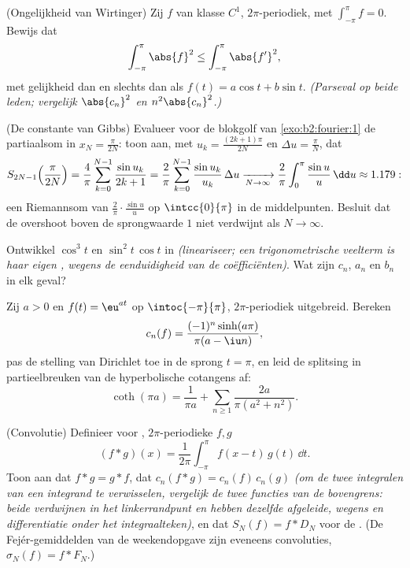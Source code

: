 \begin{exercise}[$\star\star\star$]\label{exo:b2:fourier:7}
(Ongelijkheid van Wirtinger) Zij $f$ van klasse $C^1$,
$2\pi$-periodiek, met $\int_{-\pi}^{\pi} f = 0$. Bewijs dat
\[
\int_{-\pi}^{\pi} \abs{f}^2 \leq \int_{-\pi}^{\pi} \abs{f'}^2 ,
\]
met gelijkheid dan en slechts dan als $f(t) = a\cos t + b\sin t$.
\emph{(Parseval op beide leden; vergelijk $\abs{c_n}^2$ en
$n^2\abs{c_n}^2$.)}
\end{exercise}

\begin{exercise}[$\star\star\star$]\label{exo:b2:fourier:8}
(De constante van Gibbs) Evalueer voor de blokgolf van
\cref{exo:b2:fourier:1} de partiaalsom in $x_N = \frac{\pi}{2N}$:
toon aan, met $u_k = \frac{(2k+1)\pi}{2N}$ en $\Delta u =
\frac{\pi}{N}$, dat
\[
S_{2N-1}\Bigl(\frac{\pi}{2N}\Bigr)
= \frac{4}{\pi}\sum_{k=0}^{N-1} \frac{\sin u_k}{2k+1}
= \frac{2}{\pi}\sum_{k=0}^{N-1} \frac{\sin u_k}{u_k}\,\Delta u
\xrightarrow[N\to\infty]{}
\frac{2}{\pi}\int_0^{\pi}\frac{\sin u}{u}\,\dd u \approx 1.179 :
\]
een Riemannsom van $\frac{2}{\pi}\cdot\frac{\sin u}{u}$ op
$\intcc{0}{\pi}$ in de middelpunten. Besluit dat de overshoot
boven de sprongwaarde $1$ niet verdwijnt als $N \to \infty$.
\end{exercise}

\begin{exercise}[$\star$]\label{exo:b2:fourier:9}
Ontwikkel $\cos^3 t$ en $\sin^2 t\,\cos t$ in 
\emph{(lineariseer; een trigonometrische veelterm is haar eigen
, wegens de eenduidigheid van de coëfficiënten)}. Wat
zijn $c_n$, $a_n$ en $b_n$ in elk geval?
\end{exercise}

\begin{exercise}[$\star\star$]\label{exo:b2:fourier:10}
Zij $a > 0$ en $f(t) = \eu^{at}$ op $\intoc{-\pi}{\pi}$,
$2\pi$-periodiek uitgebreid. Bereken
\[
c_n(f) = \frac{(-1)^n\sinh(a\pi)}{\pi(a - \iu n)} ,
\]
pas de stelling van Dirichlet toe in de sprong $t = \pi$, en leid
de splitsing in partieelbreuken van de hyperbolische cotangens af:
\[
\coth(\pi a) = \frac{1}{\pi a} + \sum_{n\geq1}
\frac{2a}{\pi(a^2 + n^2)} .
\]
\end{exercise}

\begin{exercise}[$\star\star$]\label{exo:b2:fourier:11}
(Convolutie) Definieer voor , $2\pi$-periodieke $f, g$
\[
(f * g)(x) = \frac{1}{2\pi}\int_{-\pi}^{\pi} f(x - t)\,g(t)\,
\dd t .
\]
Toon aan dat $f * g = g * f$, dat $c_n(f*g) = c_n(f)\,c_n(g)$
\emph{(om de twee integralen van een  integrand te
verwisselen, vergelijk de twee functies van de bovengrens: beide
verdwijnen in het linkerrandpunt en hebben dezelfde afgeleide,
wegens  en differentiatie onder het integraalteken)},
en dat $S_N(f) = f * D_N$ voor de . (De
Fejér-gemiddelden van de weekendopgave zijn eveneens convoluties,
$\sigma_N(f) = f * F_N$.)
\end{exercise}

